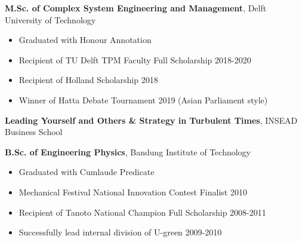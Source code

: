 %
%
%


\begin{scholarship}
					{\textbf{M.Sc. of Complex System Engineering and Management}, Delft University of Technology \href{https://repository.tudelft.nl/islandora/object/uuid\%3A87c0546d-eee4-4643-b431-49306c37949d}{ \faGlobe}

                    
					\begin{itemize}
					    \item Graduated with Honour Annotation
					    \item Recipient of TU Delft TPM Faculty Full Scholarship 2018-2020
					    \item Recipient of Holland Scholarship 2018
					    \item Winner of Hatta Debate Tournament 2019 (Asian Parliament style)
					\end{itemize}
					}
					
					{\textbf{Leading Yourself and Others \& Strategy in Turbulent Times}, INSEAD Business School}	
					
					
					{\textbf{B.Sc. of Engineering Physics}, Bandung Institute of Technology \href{https://www.researchgate.net/publication/299408943_Image_analysis_for_dental_bone_quality_assessment_using_CBCT_imaging}{ \faGlobe}

					\begin{itemize}
					    \item Graduated with Cumlaude Predicate
					    \item Mechanical Festival National Innovation Contest Finalist 2010
					    \item Recipient of Tanoto National Champion Full Scholarship 2008-2011
					    \item Successfully lead internal division of U-green 2009-2010
					\end{itemize}
					}
\end{scholarship}